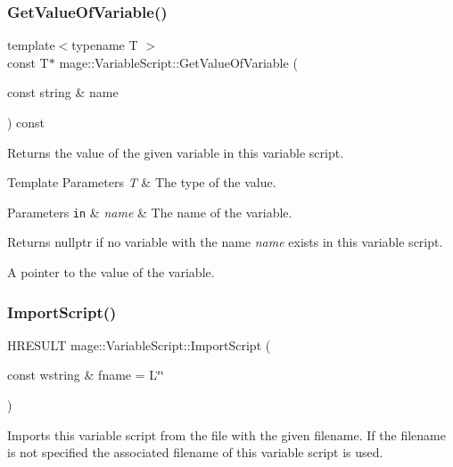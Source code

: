 \subsubsection{\texorpdfstring{Get\+Value\+Of\+Variable()}{GetValueOfVariable()}}
{\footnotesize\ttfamily template$<$typename T $>$ \\
const T$\ast$ mage\+::\+Variable\+Script\+::\+Get\+Value\+Of\+Variable (\begin{DoxyParamCaption}\item[{const string \&}]{name }\end{DoxyParamCaption}) const}

Returns the value of the given variable in this variable script.


\begin{DoxyTemplParams}{Template Parameters}
{\em T} & The type of the value. \\
\hline
\end{DoxyTemplParams}

\begin{DoxyParams}[1]{Parameters}
\mbox{\tt in}  & {\em name} & The name of the variable. \\
\hline
\end{DoxyParams}
\begin{DoxyReturn}{Returns}
{\ttfamily nullptr} if no variable with the name {\itshape name} exists in this variable script. 

A pointer to the value of the variable. 
\end{DoxyReturn}
\hypertarget{classmage_1_1_variable_script_aecdf36fb3068b0f00bec9bf29fe7bb25}{}\label{classmage_1_1_variable_script_aecdf36fb3068b0f00bec9bf29fe7bb25} 
\subsubsection{\texorpdfstring{Import\+Script()}{ImportScript()}}
{\footnotesize\ttfamily H\+R\+E\+S\+U\+LT mage\+::\+Variable\+Script\+::\+Import\+Script (\begin{DoxyParamCaption}\item[{const wstring \&}]{fname = {\ttfamily L\char`\"{}\char`\"{}} }\end{DoxyParamCaption})}

Imports this variable script from the file with the given filename. If the filename is not specified the associated filename of this variable script is used.


